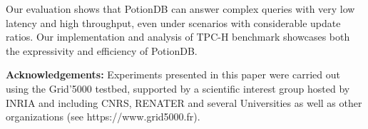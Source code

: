 \documentclass[sigplan,10pt]{acmart}
\begin{document}
Our evaluation shows that PotionDB can answer complex queries with very low latency and high throughput, even under scenarios with considerable update ratios.
Our implementation and analysis of TPC-H benchmark showcases both the expressivity and efficiency of PotionDB.

\textbf{Acknowledgements:} 
Experiments presented in this paper were carried out using the Grid'5000 testbed, supported by a scientific interest group hosted by INRIA and including CNRS, RENATER and several Universities as well as other organizations (see https://www.grid5000.fr).


\balance



\end{document}
